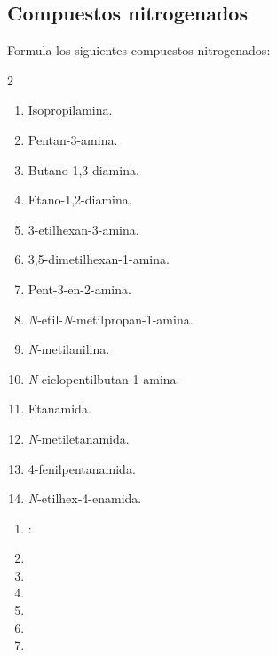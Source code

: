 \subsection*{Compuestos nitrogenados}

\begin{exercise}
    Formula los siguientes compuestos nitrogenados:
    \begin{multicols}{2}
        \begin{enumerate}[label=\alph*)]
            \item Isopropilamina.
            \item Pentan-3-amina.
            \item Butano-1,3-diamina.
            \item Etano-1,2-diamina.
            \item 3-etilhexan-3-amina.
            \item 3,5-dimetilhexan-1-amina.
            \item Pent-3-en-2-amina.
            \item \textit{N}-etil-\textit{N}-metilpropan-1-amina.
            \item \textit{N}-metilanilina.
            \item \textit{N}-ciclopentilbutan-1-amina.
            \item Etanamida.
            \item \textit{N}-metiletanamida.
            \item 4-fenilpentanamida.
            \item \textit{N}-etilhex-4-enamida.
        \end{enumerate}
    \end{multicols}
    \begin{solu}
        \begin{enumerate}[label=\alph*)]
            \item {}: 
            \item {}
            \item {}
            \item {}
            \item {}
            \item {}
            \item {}

\end{enumerate}
\end{solu}
\end{exercise}
